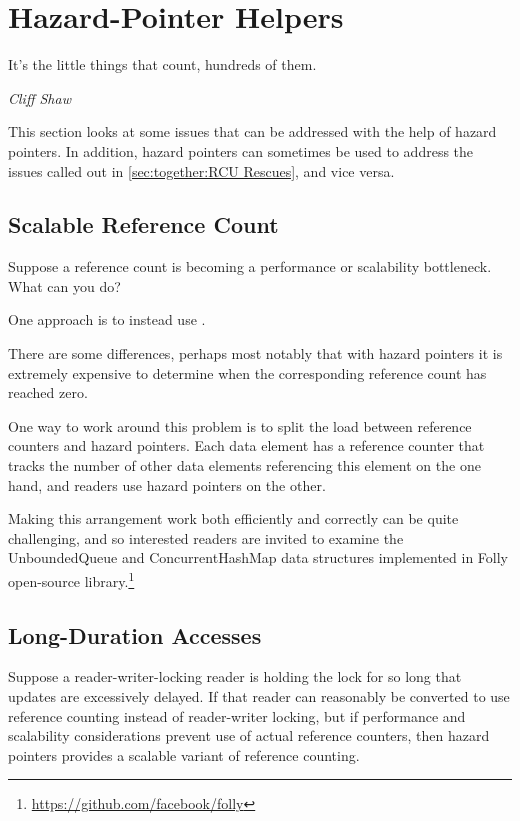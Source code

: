 
\section{Hazard-Pointer Helpers}
\label{sec:together:Hazard-Pointer Helpers}
%
\epigraph{It's the little things that count, hundreds of them.}
	 {\emph{Cliff Shaw}}

This section looks at some issues that can be addressed with the
help of hazard pointers.
In addition, hazard pointers can sometimes be used to address the
issues called out in \cref{sec:together:RCU Rescues}, and vice versa.

\subsection{Scalable Reference Count}
\label{sec:together:Scalable Reference Count}

Suppose a reference count is becoming a performance or scalability
bottleneck.
What can you do?

One approach is to instead use .

There are some differences, perhaps most notably that with
hazard pointers it is extremely expensive to determine when
the corresponding reference count has reached zero.

One way to work around this problem is to split the load between
reference counters and hazard pointers.
Each data element has a reference counter that tracks the number
of other data elements referencing this element on the one hand,
and readers use hazard pointers on the other.

Making this arrangement work both efficiently and correctly can be
quite challenging, and so interested readers are invited to examine
the UnboundedQueue and ConcurrentHashMap data structures implemented in
Folly open-source library.\footnote{
	\url{https://github.com/facebook/folly}}

\subsection{Long-Duration Accesses}
\label{sec:together:Long-Duration Accesses}

Suppose a reader-writer-locking reader is holding the lock for so
long that updates are excessively delayed.
If that reader can reasonably be converted to use reference counting
instead of reader-writer locking, but if performance and scalability
considerations prevent use of actual reference counters, then hazard
pointers provides a scalable variant of reference counting.

